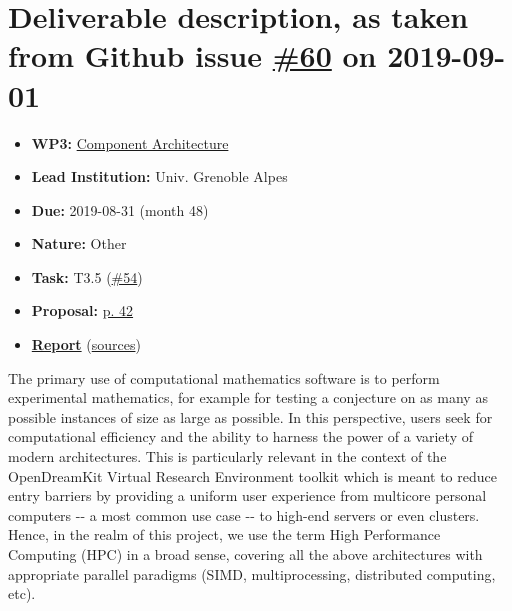 \hypertarget{deliverable-description-as-taken-from-github-issue-60-on-2019-09-01}{%
\section*{\texorpdfstring{Deliverable description, as taken from Github
issue
\href{https://github.com/OpenDreamKit/OpenDreamKit/issues/60}{\#60} on
2019-09-01}{Deliverable description, as taken from Github issue \#60 on 2019-09-01}}\label{deliverable-description-as-taken-from-github-issue-60-on-2019-09-01}}

\begin{itemize}
\tightlist
\item
  \textbf{WP3:}
  \href{https://github.com/OpenDreamKit/OpenDreamKit/tree/master/WP3}{Component
  Architecture}
\item
  \textbf{Lead Institution:} Univ. Grenoble Alpes
\item
  \textbf{Due:} 2019-08-31 (month 48)
\item
  \textbf{Nature:} Other
\item
  \textbf{Task:} T3.5
  (\href{https://github.com/OpenDreamKit/OpenDreamKit/issues/54}{\#54})
\item
  \textbf{Proposal:}
  \href{https://github.com/OpenDreamKit/OpenDreamKit/raw/master/Proposal/proposal-www.pdf}{p.
  42}
\item
  \textbf{\href{https://github.com/OpenDreamKit/OpenDreamKit/raw/master/WP3/D3.11/report-final.pdf}{Report}}
  (\href{https://github.com/OpenDreamKit/OpenDreamKit/raw/master/WP3/D3.11/}{sources})
\end{itemize}

The primary use of computational mathematics software is to perform
experimental mathematics, for example for testing a conjecture on as
many as possible instances of size as large as possible. In this
perspective, users seek for computational efficiency and the ability to
harness the power of a variety of modern architectures. This is
particularly relevant in the context of the OpenDreamKit Virtual
Research Environment toolkit which is meant to reduce entry barriers by
providing a uniform user experience from multicore personal computers
-\/- a most common use case -\/- to high-end servers or even clusters.
Hence, in the realm of this project, we use the term High Performance
Computing (HPC) in a broad sense, covering all the above architectures
with appropriate parallel paradigms (SIMD, multiprocessing, distributed
computing, etc).

